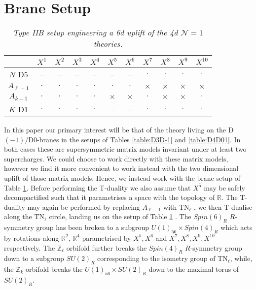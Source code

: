 \documentclass[main.tex]{subfiles}
\begin{document}
\section{Brane Setup}
\begin{table}[h!]
\centering
\begin{tabular}{ |c |c| c| c| c| c| c| c| c| c| c| }
\hline
   & $X^1$ & $X^2$ & $X^3$ & $X^4$ & $X^5$ & $X^6$ & $X^7$ & $X^8$ & $X^9$& $X^{10}$\\\hline 
 $N$ D$5$ & -- & -- & -- & -- & -- & -- & $\cdot$ & $\cdot$ & $\cdot$ & $\cdot$\\ \hline
 $A_{\ell-1}$ & $\cdot$ & $\cdot$ & $\cdot$ & $\cdot$ & $\cdot$ & $\cdot$ & $\times$ &$\times$ & $\times$ & $\times$\\ \hline
 $A_{k-1}$ & $\cdot$ & $\cdot$ & $\cdot$ & $\cdot$ & $\times$ & $\times$ & $\cdot$ & $\times$ & $\times$ & $\cdot$\\ \hline
 \hline
 $K$ D$1$ & $\cdot$ & $\cdot$ & $\cdot$ & $\cdot$ & -- & -- & $\cdot$ & $\cdot$ & $\cdot$ & $\cdot$ \\\hline
\end{tabular}
\caption{\it Type IIB setup engineering a 6d uplift of the 4d $\mathcal{N}=1$ theories.}
\label{table:D5D1}
\end{table}
In this paper our primary interest will be that of the theory living on the D$(-1)$/D$0$-branes in the setups of Tables \ref{table:D3D-1} and \ref{table:D4D01}. In both cases these are supersymmetric matrix models invariant under at least two supercharges. We could choose to work directly with these matrix models, however we find it more convenient to work instead with the two dimensional uplift of those matrix models. Hence, we instead work with the brane setup of Table \ref{table:D5D1}. Before performing the T-duality we also assume that $X^5$ may be safely decompactified such that it parametrises a space with the topology of $\mathbb{R}$. The T-duality may again be performed by replacing $A_{\ell-1}$ with TN$_{\ell}$ , we then T-dualise along the TN$_{\ell}$ circle, landing us on the setup of Table \ref{table:D5D1} .
The $Spin(6)_{R}$ $R$-symmetry group has been broken to a subgroup $U(1)_{56}\times Spin(4)_R$ which acts by rotations along $\mathbb{R}^2$, $\mathbb{R}^4$ parametrised by $X^5,X^6$ and $X^7,X^8,X^9,X^{10}$ respectively. The $\mathbb{Z}_{\ell}$ orbifold further breaks the $Spin(4)_R$ $R$-symmetry group down to a subgroup $SU(2)_{R}$ corresponding to the isometry group of TN$_{\ell}$, while, the $\mathbb{Z}_k$ orbifold breaks the $U(1)_{56}\times SU(2)_R$ down to the maximal torus of $SU(2)_R$.
\end{document}
